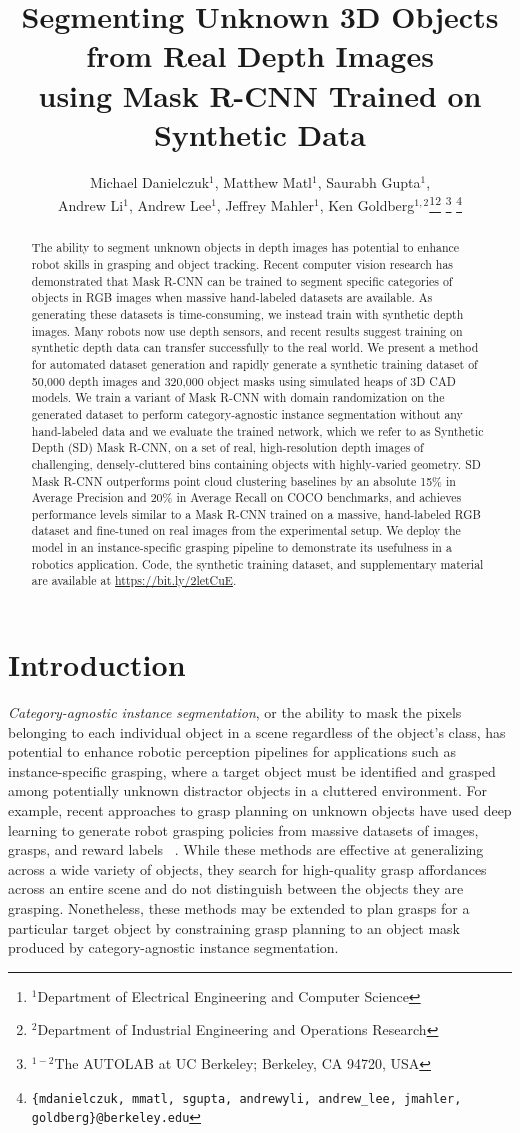 \documentclass[letterpaper, 10 pt, conference]{ieeeconf}  \pdfoutput=1
\title{Segmenting Unknown 3D Objects from Real Depth Images\\ using Mask R-CNN Trained on Synthetic Data}
\author{Michael Danielczuk$^{1}$, Matthew Matl$^{1}$, Saurabh Gupta$^{1}$,\\ Andrew Li$^{1}$, Andrew Lee$^{1}$, Jeffrey Mahler$^{1}$, Ken Goldberg$^{1,2}$\thanks{$^{1}$Department of Electrical Engineering and Computer Science}\thanks{$^{2}$Department of Industrial Engineering and Operations Research}
\thanks{$^{1-2}$The AUTOLAB at UC Berkeley; Berkeley, CA 94720, USA}
\thanks{{\tt\small \{mdanielczuk, mmatl, sgupta, andrewyli, andrew\_lee, jmahler, goldberg\}@berkeley.edu}}}
\numberwithin{equation}{section}
\begin{document}
\maketitle

\begin{abstract}
The ability to segment unknown objects in depth images has potential to enhance robot skills in grasping and object tracking.
Recent computer vision research has demonstrated that Mask R-CNN can be trained to segment specific categories of objects in RGB images when massive hand-labeled datasets are available.
As generating these datasets is time-consuming, we instead train with synthetic depth images. Many robots now use depth sensors, and recent results suggest training on synthetic depth data can transfer successfully to the real world. 
We present a method for automated dataset generation and rapidly generate a synthetic training dataset of 50,000 depth images and 320,000 object masks using simulated heaps of 3D CAD models.
We train a variant of Mask R-CNN with domain randomization on the generated dataset to perform category-agnostic instance segmentation without any hand-labeled data and we evaluate the trained network, which we refer to as Synthetic Depth (SD) Mask R-CNN, on a set of real, high-resolution depth images of challenging, densely-cluttered bins containing objects with highly-varied geometry. SD Mask R-CNN outperforms point cloud clustering baselines by an absolute 15\% in Average Precision and 20\% in Average Recall on COCO benchmarks, and achieves performance levels similar to a Mask R-CNN trained on a massive, hand-labeled RGB dataset and fine-tuned on real images from the experimental setup. We deploy the model in an instance-specific grasping pipeline to demonstrate its usefulness in a robotics application.
Code, the synthetic training dataset, and supplementary material are available at \url{https://bit.ly/2letCuE}.
\end{abstract}
 \section{Introduction}
\textit{Category-agnostic instance segmentation}, or the ability to mask the pixels belonging to each individual object in a scene regardless of the object's class, has potential to enhance robotic perception pipelines for applications such as instance-specific grasping, where a target object must be identified and grasped among potentially unknown distractor objects in a cluttered environment.
For example, recent approaches to grasp planning on unknown objects have used deep learning to generate robot grasping policies from massive datasets of images, grasps, and reward labels ~\cite{mahlerdexnet2, ten2018using}.
While these methods are effective at generalizing across a wide variety of objects, they search for high-quality grasp affordances across an entire scene and do not distinguish between the objects they are grasping.
Nonetheless, these methods may be extended to plan grasps for a particular target object by constraining grasp planning to an object mask produced by category-agnostic instance segmentation.
\end{document}

